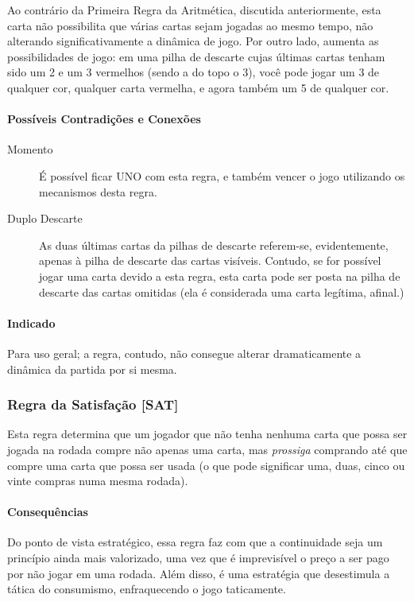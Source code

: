 Ao contrário da Primeira Regra da Aritmética, discutida anteriormente, esta carta não possibilita que várias cartas sejam jogadas ao mesmo tempo, não alterando significativamente a dinâmica de jogo. Por outro lado, aumenta as possibilidades de jogo: em uma pilha de descarte cujas últimas cartas tenham sido um 2 e um 3 vermelhos (sendo a do topo o 3), você pode jogar um 3 de qualquer cor, qualquer carta vermelha, e agora também um 5 de qualquer cor.

\paragraph{Possíveis Contradições e Conexões}

\begin{description}
\item[Momento]{É possível ficar UNO com esta regra, e também vencer o jogo utilizando os mecanismos desta regra.}
\item[Duplo Descarte]{As duas últimas cartas da pilhas de descarte referem-se, evidentemente, apenas à pilha de descarte das cartas visíveis. Contudo, se for possível jogar uma carta devido a esta regra, esta carta pode ser posta na pilha de descarte das cartas omitidas (ela é considerada uma carta legítima, afinal.)}
\end{description}

\paragraph{Indicado} 

Para uso geral; a regra, contudo, não consegue alterar dramaticamente a dinâmica da partida por si mesma.

\subsubsection{Regra da Satisfação [SAT]}

Esta regra determina que um jogador que não tenha nenhuma carta que possa ser jogada na rodada compre não apenas uma carta, mas \emph{prossiga} comprando até que compre uma carta que possa ser usada (o que pode significar uma, duas, cinco ou vinte compras numa mesma rodada).

\paragraph{Consequências}

Do ponto de vista estratégico, essa regra faz com que a continuidade seja um princípio ainda mais valorizado, uma vez que é imprevisível o preço a ser pago por não jogar em uma rodada. Além disso, é uma estratégia que desestimula a tática do consumismo, enfraquecendo o jogo taticamente.


